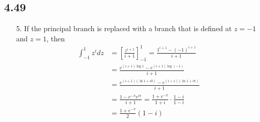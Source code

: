 \documentclass[a4paper,12pt]{article}
\begin{document}
\subsection*{4.49}
\begin{enumerate}
    \item[5.]
        If the principal branch is replaced with a branch that is defined at $z = -1$ and $z = 1$, then
        \begin{align*}
            \int_{-1}^1 z^i dz &= \left[ \frac{z^{i + 1}}{i + 1} \right]_{-1}^1
            = \frac{1^{i + 1} - (-1)^{i + 1}}{i + 1} \\
            &= \frac{e^{(i + 1) \log 1} - e^{(i + 1) \log(-1)}}{i + 1} \\
            &= \frac{e^{(i + 1)(\ln 1 + i0)} - e^{(i + 1)(\ln 1 + i\pi)}}{i + 1} \\
            &= \frac{1 - e^{-\pi} e^{i\pi}}{i + 1}
            = \frac{1 + e^{-\pi}}{1 + i} \cdot \frac{1 - i}{1 - i} \\
            &= \frac{1 + e^{-\pi}}{2} (1 - i)
        \end{align*}
\end{enumerate}
\end{document}
